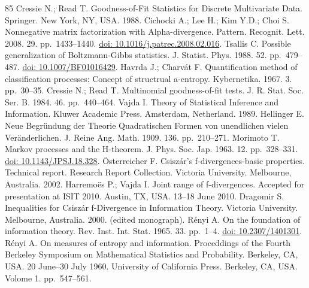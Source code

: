 \begin{thebibliography}{85}
\hypertarget{B44-entropy-12-01532}{} Cressie N.; Read T. Goodness-of-Fit Statistics for Discrete Multivariate Data. Springer. New York, NY, USA. 1988.
\hypertarget{B45-entropy-12-01532}{} Cichocki A.; Lee H.; Kim Y.D.; Choi S. Nonnegative matrix factorization with Alpha-divergence. Pattern. Recognit. Lett. 2008. 29. pp.~1433--1440. \href{https://doi.org/10.1016/j.patrec.2008.02.016}{doi: 10.1016/j.patrec.2008.02.016}.
\hypertarget{B46-entropy-12-01532}{} Tsallis C. Possible generalization of Boltzmann-Gibbs statistics. J. Statist. Phys. 1988. 52. pp.~479--487. \href{https://doi.org/10.1007/BF01016429}{doi: 10.1007/BF01016429}.
\hypertarget{B47-entropy-12-01532}{} Havrda J.; Charvát F. Quantification method of classification processes: Concept of structrual a-entropy. Kybernetika. 1967. 3. pp.~30--35.
\hypertarget{B48-entropy-12-01532}{} Cressie N.; Read T. Multinomial goodness-of-fit tests. J. R. Stat. Soc. Ser. B. 1984. 46. pp.~440--464.
\hypertarget{B49-entropy-12-01532}{} Vajda I. Theory of Statistical Inference and Information. Kluwer Academic Press. Amsterdam, Netherland. 1989.
\hypertarget{B50-entropy-12-01532}{} Hellinger E. Neue Begründung der Theorie Quadratischen Formen von unendlichen vielen Veränderlichen. J. Reine Ang. Math. 1909. 136. pp.~210--271.
\hypertarget{B51-entropy-12-01532}{} Morimoto T. Markov processes and the H-theorem. J. Phys. Soc. Jap. 1963. 12. pp.~328--331. \href{https://doi.org/10.1143/JPSJ.18.328}{doi: 10.1143/JPSJ.18.328}.
\hypertarget{B52-entropy-12-01532}{} Österreicher F. Csiszár’s f-divergences-basic properties. Technical report. Research Report Collection. Victoria University. Melbourne, Australia. 2002.
\hypertarget{B53-entropy-12-01532}{} Harremoës P.; Vajda I. Joint range of f-divergences. Accepted for presentation at ISIT 2010. Austin, TX, USA. 13–18 June 2010.
\hypertarget{B54-entropy-12-01532}{} Dragomir S. Inequalities for Csiszár f-Divergence in Information Theory. Victoria University. Melbourne, Australia. 2000. (edited monograph).
\hypertarget{B55-entropy-12-01532}{} Rényi A. On the foundation of information theory. Rev. Inst. Int. Stat. 1965. 33. pp.~1--4. \href{https://doi.org/10.2307/1401301}{doi: 10.2307/1401301}.
\hypertarget{B56-entropy-12-01532}{} Rényi A. On measures of entropy and information. Proceddings of the Fourth Berkeley Symposium on Mathematical Statistics and Probability. Berkeley, CA, USA. 20 June–30 July 1960. University of California Press. Berkeley, CA, USA. Volome 1. pp.~547--561.

\end{thebibliography}
